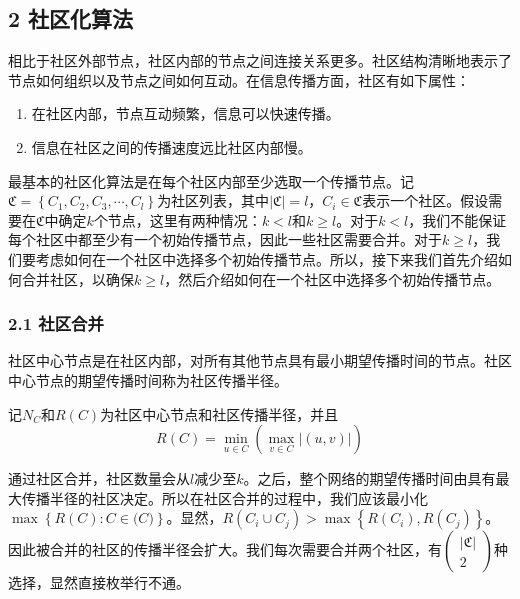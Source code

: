 \documentclass[UTF8]{ctexart}
\begin{document}
\subsection*{2 社区化算法}
\par 相比于社区外部节点，社区内部的节点之间连接关系更多。社区结构清晰地表示了节点如何组织以及节点之间如何互动。在信息传播方面，社区有如下属性：
\begin{enumerate}[\indent 1)]
\item 在社区内部，节点互动频繁，信息可以快速传播。
\item 信息在社区之间的传播速度远比社区内部慢。
\end{enumerate}
\par 最基本的社区化算法是在每个社区内部至少选取一个传播节点。记$\mathfrak{C} = \left \{ C_1,C_2,C_3,\cdots,C_l \right \}$为社区列表，其中$\left | \mathfrak{C}  \right |=l$，$C_i \in \mathfrak{C}$表示一个社区。假设需要在$\mathfrak{C}$中确定$k$个节点，这里有两种情况：$k<l$和$k\geq l$。对于$k<l$，我们不能保证每个社区中都至少有一个初始传播节点，因此一些社区需要合并。对于$k \geq l$，我们要考虑如何在一个社区中选择多个初始传播节点。所以，接下来我们首先介绍如何合并社区，以确保$k\geq l$，然后介绍如何在一个社区中选择多个初始传播节点。

\subsubsection*{2.1 社区合并}


\par 社区中心节点是在社区内部，对所有其他节点具有最小期望传播时间的节点。社区中心节点的期望传播时间称为社区传播半径。

\par 记$N_C$和$R(C)$为社区中心节点和社区传播半径，并且
\begin{equation}R(C) = \min_{u \in C}(\max_{v \in C}\left | (u,v) \right |)\label{equ:5}\end{equation}

\par 通过社区合并，社区数量会从$l$减少至$k$。之后，整个网络的期望传播时间由具有最大传播半径的社区决定。所以在社区合并的过程中，我们应该最小化$\max \left \{ R(C):C \in \mathfrak(C) \right \}$。显然，$R(C_i \cup C_j) > \max\left \{R(C_i),R(C_j)\right \}$。因此被合并的社区的传播半径会扩大。我们每次需要合并两个社区，有$\begin{pmatrix}
\left |\mathfrak{C}  \right |\\ 
2
\end{pmatrix}$种选择，显然直接枚举行不通。
\end{document}
